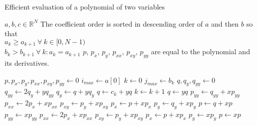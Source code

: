 \documentclass[twocolumn,letterpaper,11pt]{article}
\begin{document}
\begin{algorithm}
\caption{Efficient evaluation of a polynomial of two variables}\label{alg:poly2}
\begin{algorithmic}[1]
\REQUIRE $a,b,c \in \mathbb{R}^N$
\REQUIRE The coefficient order is sorted in descending order of $a$ and then $b$ so that\\
$a_k \ge a_{k+1}\ \forall\ k \in [0,N-1)$\\
$b_k > b_{k+1}\ \forall\ k : a_k = a_{k+1}$
\ENSURE $p$, $p_x$, $p_y$, $p_{xx}$, $p_{xy}$, $p_{yy}$ are equal to the polynomial and its derivatives.

\STATE $p, p_x, p_y, p_{xx}, p_{xy}, p_{yy} \leftarrow 0$
\STATE $i_{max} \leftarrow a[0]$
\STATE $k \leftarrow 0$
        \STATE $j_{max} \leftarrow b_k$
        \STATE $q,q_y,q_{yy} \leftarrow 0$
            \STATE $q_{yy} \leftarrow 2 q_y + y q_{yy}$
            \STATE $q_y \leftarrow q + y q_y$
                \STATE $q \leftarrow c_k + y q$
                \STATE $k \leftarrow k+1$
            \ELSE
                \STATE $q \leftarrow y q$
            \ENDIF
        \ENDFOR
        \STATE $p_{yy} \leftarrow q_{yy} + x p_{yy}$
        \STATE $p_{xx} \leftarrow 2 p_x + x p_{xx}$
        \STATE $p_{xy} \leftarrow p_y + x p_{xy}$
        \STATE $p_x \leftarrow p + x p_x$
        \STATE $p_y \leftarrow q_y + x p_y$
        \STATE $p \leftarrow q + x p$
    \ELSE
        \STATE $p_{yy} \leftarrow x p_{yy}$
        \STATE $p_{xx} \leftarrow 2 p_x + x p_{xx}$
        \STATE $p_{xy} \leftarrow p_y + x p_{xy}$
        \STATE $p_x \leftarrow p + x p_x$
        \STATE $p_y \leftarrow x p_y$
        \STATE $p \leftarrow x p$
    \ENDIF
\ENDFOR
\end{algorithmic}
\end{algorithm}
\end{document}
